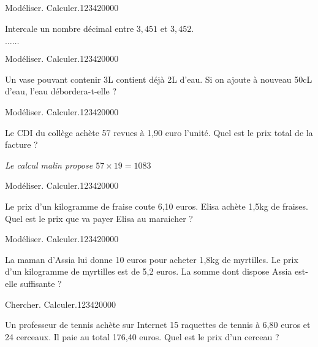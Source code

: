 \begin{pageParcoursu} 

 


\begin{ExoCu}{Modéliser. Calculer.}{1234}{2}{0}{0}{0}{0}

Intercale un nombre décimal entre $3,451$ et $3,452$.

$\ldots \ldots$



\end{ExoCu}


\begin{ExoCu}{Modéliser. Calculer.}{1234}{2}{0}{0}{0}{0}


Un vase pouvant contenir 3L contient déjà 2L d'eau. Si on ajoute à nouveau 50cL d'eau, l'eau débordera-t-elle ?

 \end{ExoCu}
 
\end{pageParcoursu}



\begin{pageParcoursd} 

 


\begin{ExoCd}{Modéliser. Calculer.}{1234}{2}{0}{0}{0}{0}

Le CDI du collège achète 57 revues à 1,90 euro l'unité. Quel est le prix total de la facture ?

\textit{Le calcul malin propose $57 \times 19 = 1083$}  



\end{ExoCd}


\begin{ExoCd}{Modéliser. Calculer.}{1234}{2}{0}{0}{0}{0}

Le prix d'un kilogramme de fraise coute 6,10 euros. Elisa achète 1,5kg de fraises. Quel est le prix que va payer Elisa au maraicher ?


 
\end{ExoCd}


\begin{ExoCd}{Modéliser. Calculer.}{1234}{2}{0}{0}{0}{0}

La maman d'Assia lui donne 10 euros pour acheter 1,8kg de myrtilles. Le prix d'un kilogramme de myrtilles est de 5,2 euros. La somme dont dispose Assia est-elle suffisante  ?

 
\end{ExoCd}
\begin{ExoCd}{Chercher. Calculer.}{1234}{2}{0}{0}{0}{0}

Un professeur de tennis achète sur Internet 15 raquettes de tennis à 6,80 euros et 24 cerceaux. Il paie au total 176,40 euros. Quel est le prix d'un cerceau  ?

 
\end{ExoCd} 
 

\end{pageParcoursd} 